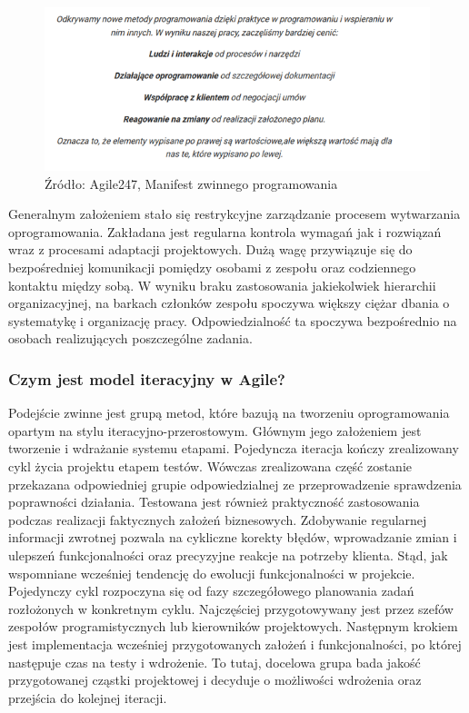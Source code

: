 \documentclass[oneside,polski,logo]{amuthesis}
\begin{document}
\begin{figure}[h]
	\centering
	\includegraphics[width=15cm]{images/hyps/manifest.png}
	\caption{Źródło: Agile247, Manifest zwinnego programowania}
\end{figure}

Generalnym założeniem stało się restrykcyjne zarządzanie procesem wytwarzania oprogramowania. Zakładana jest regularna kontrola wymagań jak i rozwiązań wraz z procesami adaptacji projektowych. Dużą wagę przywiązuje się do bezpośredniej komunikacji pomiędzy osobami z zespołu oraz codziennego kontaktu między sobą. W wyniku braku zastosowania jakiekolwiek hierarchii organizacyjnej, na barkach członków zespołu spoczywa większy ciężar dbania o systematykę i organizację pracy. Odpowiedzialność ta spoczywa bezpośrednio na osobach realizujących poszczególne zadania.\\

\subsubsection{Czym jest model iteracyjny w Agile?}
Podejście zwinne jest grupą metod, które bazują na tworzeniu oprogramowania opartym na stylu iteracyjno-przerostowym. Głównym jego założeniem jest tworzenie i wdrażanie systemu etapami. Pojedyncza iteracja kończy zrealizowany cykl życia projektu etapem testów. Wówczas zrealizowana część zostanie przekazana odpowiedniej grupie odpowiedzialnej ze przeprowadzenie sprawdzenia poprawności działania. Testowana jest również praktyczność zastosowania podczas realizacji faktycznych założeń biznesowych. Zdobywanie regularnej informacji zwrotnej pozwala na cykliczne korekty błędów, wprowadzanie zmian i ulepszeń funkcjonalności oraz precyzyjne reakcje na potrzeby klienta. Stąd, jak wspomniane wcześniej tendencję do ewolucji funkcjonalności w projekcie. Pojedynczy cykl rozpoczyna się od fazy szczegółowego planowania zadań rozłożonych w konkretnym cyklu. Najczęściej przygotowywany jest przez szefów zespołów programistycznych lub kierowników projektowych. Następnym krokiem jest implementacja wcześniej przygotowanych założeń i funkcjonalności, po której następuje czas na testy i wdrożenie. To tutaj, docelowa grupa bada jakość przygotowanej cząstki projektowej i decyduje o możliwości wdrożenia oraz przejścia do kolejnej iteracji.\\
\end{document}
